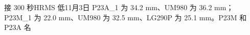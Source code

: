 \documentclass[11pt,a4paper]{article}
\numberwithin{equation}{section}
\numberwithin{figure}{section}
\begin{document}
{\cjkfont 接}\allowbreak{} 300 {\cjkfont 秒}\allowbreak{}HRMS {\cjkfont 低}\allowbreak{}11{\cjkfont 月}\allowbreak{}3{\cjkfont 日}\allowbreak{} P23A\_1 {\cjkfont 为}\allowbreak{} 34.2 mm{\cjkfont 、}\allowbreak{}UM980 {\cjkfont 为}\allowbreak{} 36.2 mm{\cjkfont ；}\allowbreak{} P23M\_1 {\cjkfont 为}\allowbreak{} 22.0 mm{\cjkfont 、}\allowbreak{}UM980 {\cjkfont 为}\allowbreak{} 32.5 mm{\cjkfont 、}\allowbreak{}LG290P {\cjkfont 为}\allowbreak{} 25.1 mm{\cjkfont 。}\allowbreak{}P23M {\cjkfont 和}\allowbreak{} P23A {\cjkfont 名}\allowbreak{}
\end{document}
